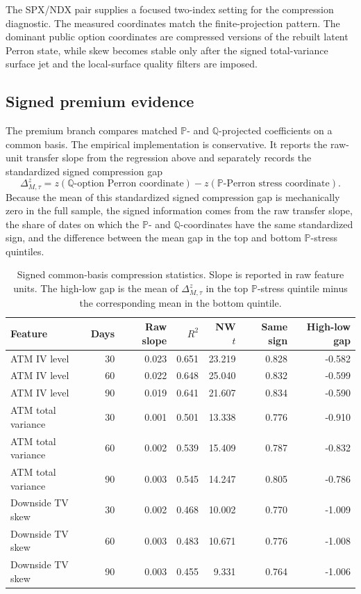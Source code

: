 \documentclass[11pt,a4paper]{amsart}
\theoremstyle{plain}
\theoremstyle{definition}
\theoremstyle{remark}
\newcommand{\PP}{\mathbb{P}}
\newcommand{\QQ}{\mathbb{Q}}
\begin{document}
The SPX/NDX pair supplies a focused two-index setting for the compression diagnostic.  The measured
coordinates match the finite-projection pattern.  The dominant public option coordinates are
compressed versions of the rebuilt latent Perron state, while skew becomes stable only after the
signed total-variance surface jet and the local-surface quality filters are imposed.

\subsection{Signed premium evidence}\label{subsec:empirical-premium-diagnostic}
The premium branch compares matched \(\PP\)- and \(\QQ\)-projected coefficients on a common basis.
The empirical implementation is conservative.  It reports the raw-unit transfer slope from the
regression above and separately records the standardized signed compression gap
\[
        \Delta^z_{M,\tau}
        =
        z\!\left(\text{\(\QQ\)-option Perron coordinate}\right)
        -
        z\!\left(\text{\(\PP\)-Perron stress coordinate}\right).
\]
Because the mean of this standardized signed compression gap is mechanically zero in the full sample, the
signed information comes from the raw transfer slope, the share of dates on which the
\(\PP\)- and \(\QQ\)-coordinates have the same standardized sign, and the difference between the
mean gap in the top and bottom \(\PP\)-stress quintiles.

\begin{table}[t]
\centering
\small
\begin{tabular}{lrrrrrr}
\hline
Feature & Days & Raw slope & \(R^2\) & NW \(t\) & Same sign & High-low gap \\
\hline
ATM IV level & 30 & 0.023 & 0.651 & 23.219 & 0.828 & -0.582 \\
ATM IV level & 60 & 0.022 & 0.648 & 25.040 & 0.832 & -0.599 \\
ATM IV level & 90 & 0.019 & 0.641 & 21.607 & 0.834 & -0.590 \\
ATM total variance & 30 & 0.001 & 0.501 & 13.338 & 0.776 & -0.910 \\
ATM total variance & 60 & 0.002 & 0.539 & 15.409 & 0.787 & -0.832 \\
ATM total variance & 90 & 0.003 & 0.545 & 14.247 & 0.805 & -0.786 \\
Downside TV skew & 30 & 0.002 & 0.468 & 10.002 & 0.770 & -1.009 \\
Downside TV skew & 60 & 0.003 & 0.483 & 10.671 & 0.776 & -1.008 \\
Downside TV skew & 90 & 0.003 & 0.455 & 9.331 & 0.764 & -1.006 \\
\hline
\end{tabular}
\caption{Signed common-basis compression statistics.  Slope is reported in raw feature units.
The high-low gap is the mean of \(\Delta^z_{M,\tau}\) in the top \(\PP\)-stress quintile minus the
corresponding mean in the bottom quintile.}
\label{tab:empirical-premium-diagnostic}
\end{table}
\end{document}
